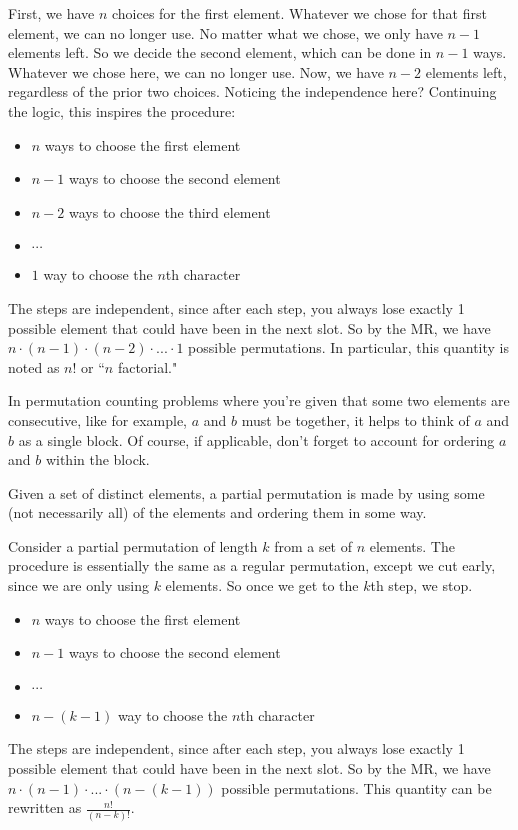 \documentclass[11pt]{scrartcl}
\begin{document}
First, we have $n$ choices for the first element. Whatever we chose for that first element, we can no longer use. No matter what we chose, we only have $n-1$ elements left. So we decide the second element, which can be done in $n-1$ ways. Whatever we chose here, we can no longer use. Now, we have $n-2$ elements left, regardless of the prior two choices. Noticing the independence here? Continuing the logic, this inspires the procedure:
\begin{itemize}
    \item $n$ ways to choose the first element
    \item $n-1$ ways to choose the second element
    \item $n-2$ ways to choose the third element
    \item $\cdots$
    \item $1$ way to choose the $n$th character
\end{itemize}
The steps are independent, since after each step, you always lose exactly 1 possible element that could have been in the next slot. So by the MR, we have $n \cdot (n-1) \cdot (n-2) \cdot ... \cdot 1$ possible permutations. In particular, this quantity is noted as $n!$ or ``$n$ factorial."

\begin{advice}
    In permutation counting problems where you're given that some two elements are consecutive, like for example, $a$ and $b$ must be together, it helps to think of $a$ and $b$ as a single block. Of course, if applicable, don't forget to account for ordering $a$ and $b$ within the block.
\end{advice}

\begin{definition}
    Given a set of distinct elements, a partial permutation is made by using some (not necessarily all) of the elements and ordering them in some way.
\end{definition}

Consider a partial permutation of length $k$ from a set of $n$ elements. The procedure is essentially the same as a regular permutation, except we cut early, since we are only using $k$ elements. So once we get to the $k$th step, we stop.

\begin{itemize}
    \item $n$ ways to choose the first element
    \item $n-1$ ways to choose the second element
    \item $\cdots$
    \item $n - (k-1)$ way to choose the $n$th character
\end{itemize}
The steps are independent, since after each step, you always lose exactly 1 possible element that could have been in the next slot. So by the MR, we have $n \cdot (n-1) \cdot ... \cdot (n - (k-1))$ possible permutations. This quantity can be rewritten as $\frac{n!}{(n-k)!}$.
\end{document}
